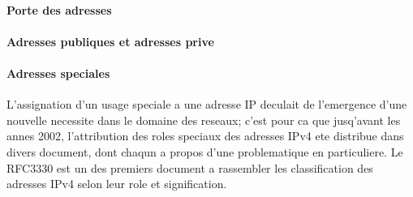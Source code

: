 \paragraph{Porte des adresses}


\paragraph{Adresses publiques et adresses prive}


\paragraph{Adresses speciales}
L'assignation d'un usage speciale a une adresse IP deculait de l'emergence
d'une nouvelle necessite dans le domaine des reseaux; c'est pour
ca que jusq'avant les annes 2002, l'attribution des roles speciaux des adresses
IPv4 ete distribue dans divers document, dont chaqun a propos d'une
problematique en particuliere. Le RFC3330 est un des premiers document a
rassembler les classification des adresses IPv4 selon leur role et signification.



